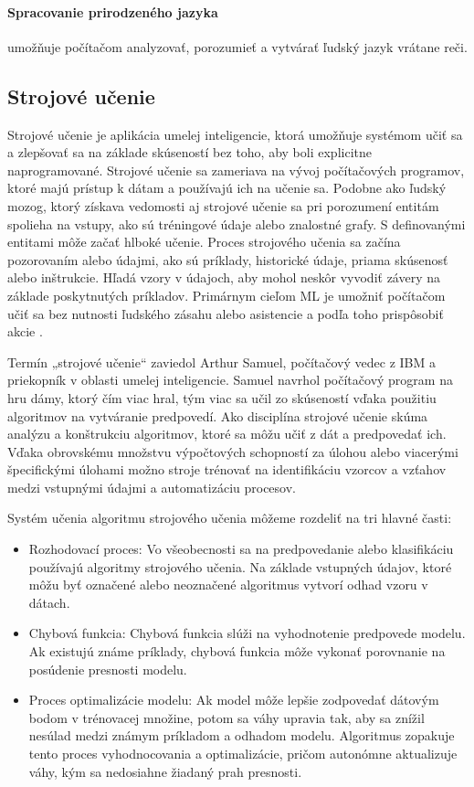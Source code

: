 \paragraph{Spracovanie prirodzeného jazyka} umožňuje počítačom analyzovať, porozumieť a vytvárať ľudský jazyk vrátane reči.

\subsection{Strojové učenie}
Strojové učenie je aplikácia umelej inteligencie, ktorá umožňuje systémom učiť sa a zlepšovať sa na základe skúseností bez toho, aby boli explicitne naprogramované. Strojové učenie sa zameriava na vývoj počítačových programov, ktoré majú prístup k dátam a používajú ich na učenie sa. Podobne ako ľudský mozog, ktorý získava vedomosti aj strojové učenie sa pri porozumení entitám spolieha na vstupy, ako sú tréningové údaje alebo znalostné grafy. S definovanými entitami môže začať hlboké učenie.
Proces strojového učenia sa začína pozorovaním alebo údajmi, ako sú príklady, historické údaje, priama skúsenosť alebo inštrukcie. Hľadá vzory v údajoch, aby mohol neskôr vyvodiť závery na základe poskytnutých príkladov. Primárnym cieľom ML je umožniť počítačom učiť sa bez nutnosti ľudského zásahu alebo asistencie a podľa toho prispôsobiť akcie \cite{ml1}.

Termín „strojové učenie“ zaviedol Arthur Samuel, počítačový vedec z IBM a priekopník v oblasti umelej inteligencie. Samuel navrhol počítačový program na hru dámy, ktorý čím viac hral, tým viac sa učil zo skúseností vďaka použitiu algoritmov na vytváranie predpovedí. Ako disciplína strojové učenie skúma analýzu a konštrukciu algoritmov, ktoré sa môžu učiť z dát a predpovedať ich. Vďaka obrovskému množstvu výpočtových schopností za úlohou alebo viacerými špecifickými úlohami možno stroje trénovať na identifikáciu vzorcov a vzťahov medzi vstupnými údajmi a automatizáciu procesov.

Systém učenia algoritmu strojového učenia môžeme rozdeliť na tri hlavné časti:
\begin{itemize}
    \item Rozhodovací proces: Vo všeobecnosti sa na predpovedanie alebo klasifikáciu používajú algoritmy strojového učenia. Na základe vstupných údajov, ktoré môžu byť označené alebo neoznačené algoritmus vytvorí odhad vzoru v dátach.
    \item Chybová funkcia: Chybová funkcia slúži na vyhodnotenie predpovede modelu. Ak existujú známe príklady, chybová funkcia môže vykonať porovnanie na posúdenie presnosti modelu.
    \item Proces optimalizácie modelu: Ak model môže lepšie zodpovedať dátovým bodom v trénovacej množine, potom sa váhy upravia tak, aby sa znížil nesúlad medzi známym príkladom a odhadom modelu. Algoritmus zopakuje tento proces vyhodnocovania a optimalizácie, pričom autonómne aktualizuje váhy, kým sa nedosiahne žiadaný prah presnosti.
\end{itemize}

